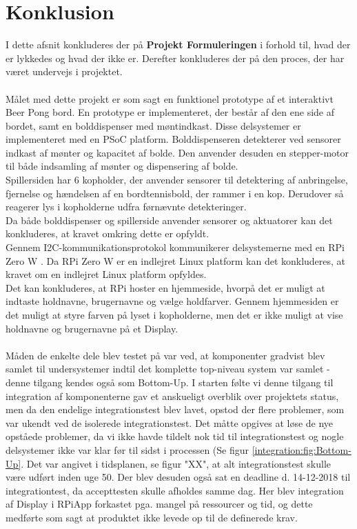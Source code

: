 \documentclass[Rapport/Rapport_main.tex]{subfiles}
\begin{document}
\section{Konklusion}
I dette afsnit konkluderes der på \textbf{Projekt Formuleringen} i forhold til, hvad der er lykkedes og hvad der ikke er. Derefter konkluderes der på den proces, der har været undervejs i projektet.\\\\
Målet med dette projekt er som sagt en funktionel prototype af et interaktivt Beer Pong bord. En prototype er implementeret, der består af den ene side af bordet, samt en bolddispenser med møntindkast. Disse delsystemer er implementeret med en PSoC platform\cite{psoc5lp}. Bolddispenseren detekterer ved sensorer indkast af mønter og kapacitet af bolde. Den anvender desuden en stepper-motor til både indsamling af mønter og dispensering af bolde.\\
Spillersiden har 6 kopholder, der anvender sensorer til detektering af anbringelse, fjernelse og hændelsen af en bordtennisbold, der rammer i en kop. Derudover så reagerer lys i kopholderne udfra førnævnte detekteringer.\\
Da både bolddispenser og spillerside anvender sensorer og aktuatorer kan det konkluderes, at kravet omkring dette er opfyldt. \\
Gennem I2C-kommunikationsprotokol\cite{i2c_protocol} kommunikerer delsystemerne med en RPi Zero W \cite{rpi_webpage}. Da RPi Zero W er en indlejret Linux platform kan det konkluderes, at kravet om en indlejret Linux platform opfyldes.\\
Det kan konkluderes, at RPi hoster en hjemmeside, hvorpå det er muligt at indtaste holdnavne, brugernavne og vælge holdfarver. Gennem hjemmesiden er det muligt at styre farven på lyset i kopholderne, men det er ikke muligt at vise holdnavne og brugernavne på et Display.\\\\
Måden de enkelte dele blev testet på var ved, at komponenter gradvist blev samlet til undersystemer indtil det komplette top-niveau system var samlet - denne tilgang kendes også som Bottom-Up. I starten følte vi denne tilgang til integration af komponenterne gav et anskueligt overblik over projektets status, men da den endelige integrationstest blev lavet, opstod der flere problemer, som var ukendt ved de isolerede integrationstest. Det måtte opgives at løse de nye opståede problemer, da vi ikke havde tildelt nok tid til integrationstest og nogle delsystemer ikke var klar før til sidst i processen (Se figur \ref{integration:fig:Bottom-Up}. Det var angivet i tidsplanen, se figur "XX", at alt integrationstest skulle være udført inden uge 50. Der blev desuden også sat en deadline d. 14-12-2018 til integrationtest, da accepttesten skulle afholdes samme dag. Her blev integration af Display i RPiApp forkastet pga. mangel på ressourcer og tid, og dette medførte som sagt at produktet ikke levede op til de definerede krav. \\\\
\end{document}
